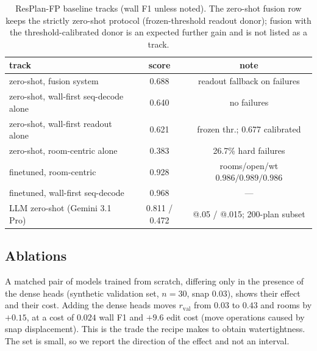 \documentclass{article}
\begin{document}
\begin{table}[t]
\centering
\caption{ResPlan-FP baseline tracks (wall F1 unless noted). The zero-shot
fusion row keeps the strictly zero-shot protocol (frozen-threshold readout
donor); fusion with the threshold-calibrated donor is an expected further
gain and is not listed as a track.}
\label{tab:resplan}
\small
\begin{tabular}{lcc}
\toprule
track & score & note \\
\midrule
zero-shot, fusion system      & 0.688 & readout fallback on failures \\
zero-shot, wall-first seq-decode alone & 0.640 & no failures \\
zero-shot, wall-first readout alone & 0.621 & frozen thr.; 0.677 calibrated \\
zero-shot, room-centric alone & 0.383 & 26.7\% hard failures \\
finetuned, room-centric       & 0.928 & rooms/open/wt $0.986/0.989/0.986$ \\
finetuned, wall-first seq-decode & 0.968 & --- \\
LLM zero-shot (Gemini 3.1 Pro) & 0.811 / 0.472 & @.05 / @.015; 200-plan subset \\
\bottomrule
\end{tabular}
\end{table}

\subsection{Ablations}
A matched pair of models trained from scratch, differing only in the presence
of the dense heads (synthetic validation set, $n{=}30$, snap $0.03$), shows
their effect and their cost. Adding the dense heads moves $r_{\mathrm{val}}$
from $0.03$ to $0.43$ and rooms by $+0.15$, at a cost of $0.024$ wall F1 and
$+9.6$ edit cost (move operations caused by snap displacement). This is the
trade the recipe makes to obtain watertightness. The set is small, so we
report the direction of the effect and not an interval.

\end{document}
